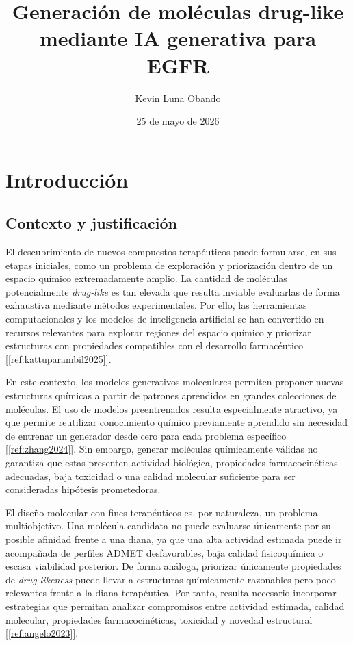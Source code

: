 \documentclass[IB]{TFUOC}%
\title{Generación de moléculas drug-like mediante IA generativa para EGFR}
\author{Kevin Luna Obando}
\date{25 de mayo de 2026}
\begin{document}
\estructura

\tableofcontents

\listoffigures

\listoftables


\chapter{Introducción}

\section{Contexto y justificación}

El descubrimiento de nuevos compuestos terapéuticos puede formularse, en sus etapas iniciales, como un problema de exploración y priorización dentro de un espacio químico extremadamente amplio. La cantidad de moléculas potencialmente \textit{drug-like} es tan elevada que resulta inviable evaluarlas de forma exhaustiva mediante métodos experimentales. Por ello, las herramientas computacionales y los modelos de inteligencia artificial se han convertido en recursos relevantes para explorar regiones del espacio químico y priorizar estructuras con propiedades compatibles con el desarrollo farmacéutico [\ref{ref:kattuparambil2025}].

En este contexto, los modelos generativos moleculares permiten proponer nuevas estructuras químicas a partir de patrones aprendidos en grandes colecciones de moléculas. El uso de modelos preentrenados resulta especialmente atractivo, ya que permite reutilizar conocimiento químico previamente aprendido sin necesidad de entrenar un generador desde cero para cada problema específico [\ref{ref:zhang2024}]. Sin embargo, generar moléculas químicamente válidas no garantiza que estas presenten actividad biológica, propiedades farmacocinéticas adecuadas, baja toxicidad o una calidad molecular suficiente para ser consideradas hipótesis prometedoras.

El diseño molecular con fines terapéuticos es, por naturaleza, un problema multiobjetivo. Una molécula candidata no puede evaluarse únicamente por su posible afinidad frente a una diana, ya que una alta actividad estimada puede ir acompañada de perfiles ADMET desfavorables, baja calidad fisicoquímica o escasa viabilidad posterior. De forma análoga, priorizar únicamente propiedades de \textit{drug-likeness} puede llevar a estructuras químicamente razonables pero poco relevantes frente a la diana terapéutica. Por tanto, resulta necesario incorporar estrategias que permitan analizar compromisos entre actividad estimada, calidad molecular, propiedades farmacocinéticas, toxicidad y novedad estructural [\ref{ref:angelo2023}].
\end{document}
